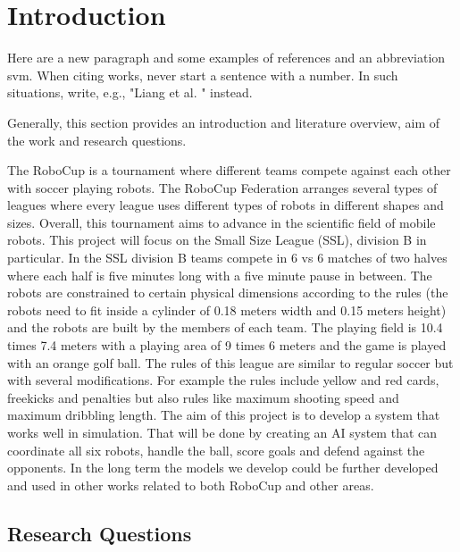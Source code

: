 \section{Introduction}
\label{section:intro}

Here are a new paragraph and some examples of references and an abbreviation \cite{IEEEtran, IEEEtranformatexample,webpage, FundConDep,exampleofjournalarticle,exampleofconferencepaper}
\ac{svm}. When citing works, never start a sentence with a number. In such situations, write, e.g., "Liang et al. \cite{exampleofconferencepaper}" instead.

Generally, this section provides an introduction and literature overview, aim of the work and research questions.

The RoboCup is a tournament where different teams compete against each other with soccer playing robots. The RoboCup Federation arranges several types of leagues where every league uses different types of robots in different shapes and sizes. Overall, this tournament aims to advance in the scientific field of mobile robots. 
This project will focus on the Small Size League (SSL), division B in particular. In the SSL division B teams compete in 6 vs 6 matches of two halves where each half is five minutes long with a five minute pause in between. The robots are constrained to certain physical dimensions according to the rules (the robots need to fit inside a cylinder of 0.18 meters width and 0.15 meters height) and the robots are built by the members of each team. The playing field is 10.4 times 7.4 meters with a playing area of 9 times 6 meters and the game is played with an orange golf ball. The rules of this league are similar to regular soccer but with several modifications. For example the rules include yellow and red cards, freekicks and penalties but also rules like maximum shooting speed and maximum dribbling length. 
The aim of this project is to develop a system that works well in simulation. That will be done by creating an AI system that can coordinate all six robots, handle the ball, score goals and defend against the opponents. In the long term the models we develop could be further developed and used in other works related to both RoboCup and other areas.

\subsection{Research Questions}
